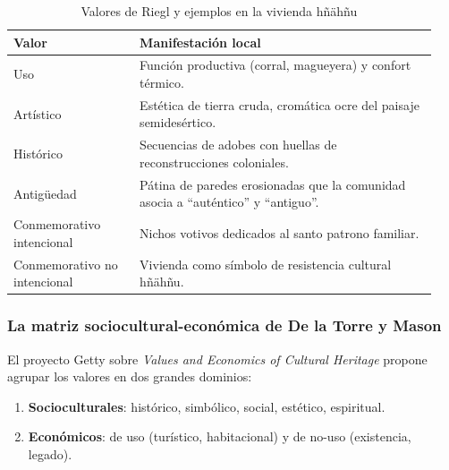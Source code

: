 \begin{table}[ht]
	\centering
	\caption{Valores de Riegl y ejemplos en la vivienda hñähñu}
	\vspace{0.25cm}
	\label{tab:riegl_valores}
	\begin{tabular}{@{}L{0.28\linewidth}L{0.66\linewidth}@{}}
		\toprule
		\textbf{Valor}               & \textbf{Manifestación local}                            \\
		\midrule
		Uso                          & Función productiva (corral, magueyera) y
		confort térmico.                                                                       \\
		Artístico                    & Estética de tierra cruda, cromática ocre del
		paisaje semidesértico.                                                                 \\
		Histórico                    & Secuencias de adobes con huellas de reconstrucciones
		coloniales.                                                                            \\
		Antigüedad                   & Pátina de paredes erosionadas que la comunidad asocia a
		“auténtico” y “antiguo”.                                                               \\
		Conmemorativo intencional    & Nichos votivos dedicados al santo patrono
		familiar.                                                                              \\
		Conmemorativo no intencional & Vivienda como símbolo de resistencia
		cultural hñähñu.                                                                       \\
		\bottomrule
	\end{tabular}
\end{table}

\subsubsection{La matriz sociocultural-económica de De la Torre y Mason}

El proyecto Getty sobre \textit{Values and Economics of Cultural
	Heritage} propone agrupar los valores en dos grandes dominios:

\begin{enumerate}
	\item \textbf{Socioculturales}: histórico, simbólico, social,
	      estético, espiritual.
	\item \textbf{Económicos}: de uso (turístico, habitacional) y de
	      no-uso (existencia, legado).\citep{delatorre2002values}
\end{enumerate}


